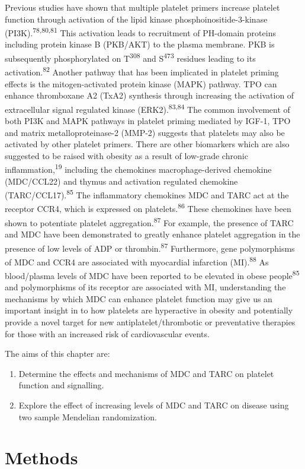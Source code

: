 \documentclass[11pt,twoside]{bristolthesis}
\providecommand{\tightlist}{%
  \setlength{\itemsep}{0pt}\setlength{\parskip}{0pt}}
\begin{document}
Previous studies have shown that multiple platelet primers increase platelet function through activation of the lipid kinase phosphoinositide-3-kinase (PI3K).\textsuperscript{78,80,81} This activation leads to recruitment of PH-domain proteins including protein kinase B (PKB/AKT) to the plasma membrane. PKB is subsequently phosphorylated on T\textsuperscript{308} and S\textsuperscript{473} residues leading to its activation.\textsuperscript{82} Another pathway that has been implicated in platelet priming effects is the mitogen-activated protein kinase (MAPK) pathway. TPO can enhance thromboxane A2 (TxA2) synthesis through increasing the activation of extracellular signal regulated kinase (ERK2).\textsuperscript{83,84} The common involvement of both PI3K and MAPK pathways in platelet priming mediated by IGF-1, TPO and matrix metalloproteinase-2 (MMP-2) suggests that platelets may also be activated by other platelet primers. There are other biomarkers which are also suggested to be raised with obesity as a result of low-grade chronic inflammation,\textsuperscript{19} including the chemokines macrophage-derived chemokine (MDC/CCL22) and thymus and activation regulated chemokine (TARC/CCL17).\textsuperscript{85} The inflammatory chemokines MDC and TARC act at the receptor CCR4, which is expressed on platelets.\textsuperscript{86} These chemokines have been shown to potentiate platelet aggregation.\textsuperscript{87} For example, the presence of TARC and MDC have been demonstrated to greatly enhance platelet aggregation in the presence of low levels of ADP or thrombin.\textsuperscript{87} Furthermore, gene polymorphisms of MDC and CCR4 are associated with myocardial infarction (MI).\textsuperscript{88} As blood/plasma levels of MDC have been reported to be elevated in obese people\textsuperscript{85} and polymorphisms of its receptor are associated with MI, understanding the mechanisms by which MDC can enhance platelet function may give us an important insight in to how platelets are hyperactive in obesity and potentially provide a novel target for new antiplatelet/thrombotic or preventative therapies for those with an increased risk of cardiovascular events.

The aims of this chapter are:
\begin{enumerate}
\def\labelenumi{\arabic{enumi})}
\tightlist
\item
  Determine the effects and mechanisms of MDC and TARC on platelet function and signalling.
\item
  Explore the effect of increasing levels of MDC and TARC on disease using two sample Mendelian randomization.
\end{enumerate}
\hypertarget{methods-2}{%
\section{Methods}\label{methods-2}}
\end{document}
